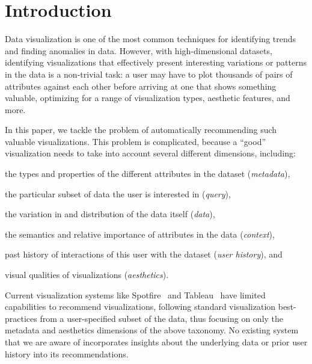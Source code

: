 
\section{Introduction}
\label{sec:introduction}


Data visualization is one of the most common techniques for identifying 
trends and finding anomalies in data.
However, with high-dimensional datasets, identifying visualizations that 
effectively present interesting variations or patterns in the data is a non-trivial task:  a
user may have to plot thousands of pairs of attributes against each other 
before arriving at one that shows something valuable, optimizing for a range of visualization 
types, aesthetic features, and more.


In this paper, we tackle the problem of automatically recommending such valuable visualizations.
This problem is complicated, because a ``good'' visualization needs to take into account several
different dimensions, including:
\begin{inparaenum}
\item the types and properties of the different attributes in the dataset ({\it metadata}), 
\item the particular subset of data the user is interested in ({\it query}), 
\item the variation in and distribution of the data itself ({\it data}), 
\item the semantics and relative importance of attributes in the data ({\it context}), 
\item past history of interactions of this user  with the dataset ({\it user history}), and
\item visual qualities of visualizations ({\it aesthetics}). 
\end{inparaenum}

Current visualization systems like Spotfire~\cite{} and Tableau~\cite{} have limited capabilities to recommend
visualizations, following standard visualization best-practices from a user-specified subset of the data, thus focusing on only the metadata and aesthetics  
dimensions of the above taxonomy.  No existing system that we are aware of 
incorporates insights about the underlying data or prior user history into its recommendations.

